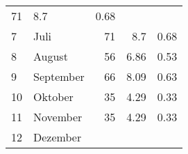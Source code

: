 \begin{longtable}{lXrrr}
       \num{71} &
       \num[round-mode=places,round-precision=2]{8,7} &
         \num[round-mode=places,round-precision=2]{0,68} \\

     7 &
     \multicolumn{1}{X}{ Juli   } &


       \num{71} &
       \num[round-mode=places,round-precision=2]{8,7} &
         \num[round-mode=places,round-precision=2]{0,68} \\

     8 &
     \multicolumn{1}{X}{ August   } &


       \num{56} &
       \num[round-mode=places,round-precision=2]{6,86} &
         \num[round-mode=places,round-precision=2]{0,53} \\

     9 &
     \multicolumn{1}{X}{ September   } &


       \num{66} &
       \num[round-mode=places,round-precision=2]{8,09} &
         \num[round-mode=places,round-precision=2]{0,63} \\

     10 &
     \multicolumn{1}{X}{ Oktober   } &


       \num{35} &
       \num[round-mode=places,round-precision=2]{4,29} &
         \num[round-mode=places,round-precision=2]{0,33} \\

     11 &
     \multicolumn{1}{X}{ November   } &


       \num{35} &
       \num[round-mode=places,round-precision=2]{4,29} &
         \num[round-mode=places,round-precision=2]{0,33} \\

     12 &
     \multicolumn{1}{X}{ Dezember   } &



\end{longtable}
